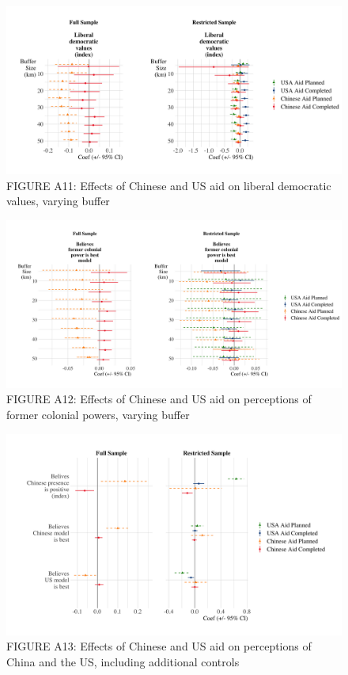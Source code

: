 \documentclass[9pt]{article}
\begin{document}
\begin{figure}[H]
\centering
\includegraphics[width=1\textwidth]{figures/figure_a11.png}
\caption{FIGURE A11: Effects of Chinese and US aid on liberal democratic values, varying buffer}
\end{figure}

\begin{figure}[H]
\centering
\includegraphics[width=1\textwidth]{figures/figure_a12.png}
\caption{FIGURE A12: Effects of Chinese and US aid on perceptions of former colonial powers, varying buffer}
\end{figure}

\begin{figure}[H]
\centering
\includegraphics[width=1\textwidth]{figures/figure_a13.png}
\caption{FIGURE A13: Effects of Chinese and US aid on perceptions of China and the US, including additional controls}
\end{figure}
\end{document}
